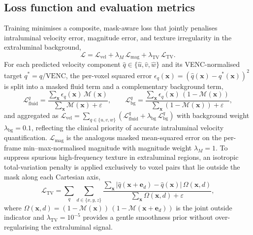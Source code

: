 \subsection*{Loss function and evaluation metrics}

Training minimises a composite, mask-aware loss that jointly penalises
intraluminal velocity error, magnitude error, and texture irregularity
in the extraluminal background,
\begin{equation}
    \mathcal{L} = \mathcal{L}_{\text{vel}}
                + \lambda_{M}\,\mathcal{L}_{\text{mag}}
                + \lambda_{\text{TV}}\,\mathcal{L}_{\text{TV}}.
\end{equation}
For each predicted velocity component
$\hat{q}\in\{\hat{u},\hat{v},\hat{w}\}$ and its VENC-normalised target
$q^{*}=q/\mathrm{VENC}$, the per-voxel squared error
$\epsilon_q(\mathbf{x})=(\hat{q}(\mathbf{x})-q^{*}(\mathbf{x}))^{2}$ is
split into a masked fluid term and a complementary background term,
\begin{equation}
    \mathcal{L}^{q}_{\text{fluid}}
    = \frac{\sum_{\mathbf{x}} \epsilon_q(\mathbf{x})\,\mathcal{M}(\mathbf{x})}
           {\sum_{\mathbf{x}} \mathcal{M}(\mathbf{x}) + \varepsilon},
    \qquad
    \mathcal{L}^{q}_{\text{bg}}
    = \frac{\sum_{\mathbf{x}} \epsilon_q(\mathbf{x})\,(1-\mathcal{M}(\mathbf{x}))}
           {\sum_{\mathbf{x}} (1-\mathcal{M}(\mathbf{x})) + \varepsilon},
\end{equation}
and aggregated as
$\mathcal{L}_{\text{vel}}
 = \sum_{q\in\{u,v,w\}}
   (\mathcal{L}^{q}_{\text{fluid}}+\lambda_{\text{bg}}\,\mathcal{L}^{q}_{\text{bg}})$
with background weight $\lambda_{\text{bg}}=0.1$, reflecting the
clinical priority of accurate intraluminal velocity quantification.
$\mathcal{L}_{\text{mag}}$ is the analogous masked mean-squared error on
the per-frame min--max-normalised magnitude with magnitude weight
$\lambda_{M}=1$. To suppress spurious high-frequency texture in
extraluminal regions, an isotropic total-variation penalty
\cite{rudin1992tv} is applied exclusively to voxel pairs that lie
outside the mask along each Cartesian axis,
\begin{equation}
    \mathcal{L}_{\text{TV}}
    = \sum_{q}\sum_{d\in\{x,y,z\}}
      \frac{\sum_{\mathbf{x}} \lvert
      \hat{q}(\mathbf{x}+\mathbf{e}_d)-\hat{q}(\mathbf{x}) \rvert\,
      \Omega(\mathbf{x},d)}
           {\sum_{\mathbf{x}} \Omega(\mathbf{x},d) + \varepsilon},
\end{equation}
where
$\Omega(\mathbf{x},d) =
 (1-\mathcal{M}(\mathbf{x}))\,(1-\mathcal{M}(\mathbf{x}+\mathbf{e}_d))$
is the joint outside indicator and
$\lambda_{\text{TV}}=10^{-5}$ provides a gentle smoothness prior
without over-regularising the extraluminal signal.

